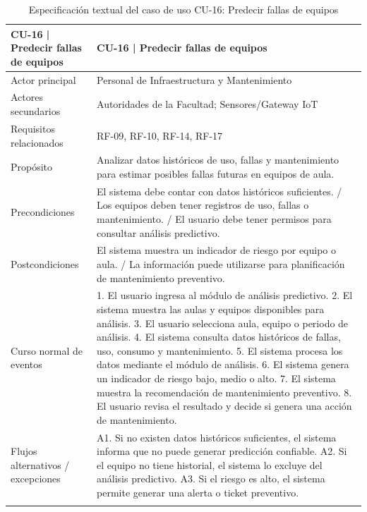 \begingroup
\small
\begin{longtable}{|p{7.8cm}|p{7.8cm}|}
\hline
CU-16 | Predecir fallas de equipos & CU-16 | Predecir fallas de equipos \\ \hline
Actor principal & Personal de Infraestructura y Mantenimiento \\ \hline
Actores secundarios & Autoridades de la Facultad; Sensores/Gateway IoT \\ \hline
Requisitos relacionados & RF-09, RF-10, RF-14, RF-17 \\ \hline
Propósito & Analizar datos históricos de uso, fallas y mantenimiento para estimar posibles fallas futuras en equipos de aula. \\ \hline
Precondiciones & El sistema debe contar con datos históricos suficientes. / Los equipos deben tener registros de uso, fallas o mantenimiento. / El usuario debe tener permisos para consultar análisis predictivo. \\ \hline
Postcondiciones & El sistema muestra un indicador de riesgo por equipo o aula. / La información puede utilizarse para planificación de mantenimiento preventivo. \\ \hline
Curso normal de eventos & 1. El usuario ingresa al módulo de análisis predictivo. 2. El sistema muestra las aulas y equipos disponibles para análisis. 3. El usuario selecciona aula, equipo o periodo de análisis. 4. El sistema consulta datos históricos de fallas, uso, consumo y mantenimiento. 5. El sistema procesa los datos mediante el módulo de análisis. 6. El sistema genera un indicador de riesgo bajo, medio o alto. 7. El sistema muestra la recomendación de mantenimiento preventivo. 8. El usuario revisa el resultado y decide si genera una acción de mantenimiento. \\ \hline
Flujos alternativos / excepciones & A1. Si no existen datos históricos suficientes, el sistema informa que no puede generar predicción confiable. A2. Si el equipo no tiene historial, el sistema lo excluye del análisis predictivo. A3. Si el riesgo es alto, el sistema permite generar una alerta o ticket preventivo. \\ \hline
\caption{Especificación textual del caso de uso CU-16: Predecir fallas de equipos}
\end{longtable}
\endgroup

